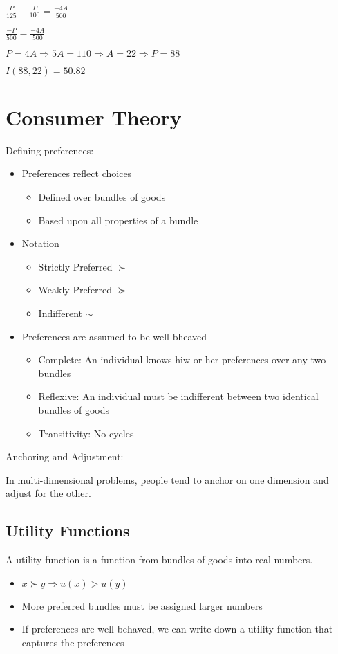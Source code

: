 \documentclass[12pt]{article}
\begin{document}
$\frac{P}{125} - \frac{P}{100} = \frac{-4A}{500}$

$\frac{-P}{500} = \frac{-4A}{500}$

$P = 4A \Rightarrow 5A = 110 \Rightarrow A = 22 \Rightarrow P = 88$

$I(88, 22) = 50.82$

\section{Consumer Theory}

Defining preferences:
\begin{itemize}
    \item Preferences reflect choices
    \begin{itemize}
        \item Defined over bundles of goods
        \item Based upon all properties of a bundle
    \end{itemize}
    \item Notation
    \begin{itemize}
        \item Strictly Preferred $\succ$
        \item Weakly Preferred $\succeq$
        \item Indifferent $\sim$
    \end{itemize}
    \item Preferences are assumed to be well-bheaved
    \begin{itemize}
        \item Complete: An individual knows hiw or her preferences over any two bundles
        \item Reflexive: An individual must be indifferent between two identical bundles of goods
        \item Transitivity: No cycles
    \end{itemize}
\end{itemize}

Anchoring and Adjustment:

In multi-dimensional problems, people tend to anchor on one dimension and adjust for the other.

\subsection{Utility Functions}

A utility function is a function from bundles of goods into real numbers.
\begin{itemize}
    \item $x \succ y \Rightarrow u(x) > u(y)$
    \item More preferred bundles must be assigned larger numbers
    \item If preferences are well-behaved, we can write down a utility function that captures the preferences
\end{itemize}
\end{document}
